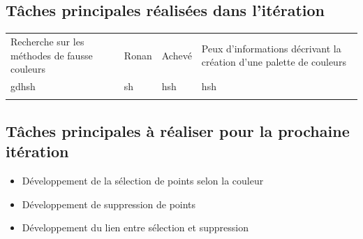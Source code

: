 \documentclass[12pt,titlepage,french]{article}
\begin{document}
\subsection{Tâches principales réalisées dans l'itération}
\noindent\begin{tabu} to \toprule
  &&&\\\toprule
Recherche sur les méthodes de fausse couleurs
& Ronan
& Achevé
& Peux d'informations décrivant la création d'une palette de couleurs\\\midrule
gdhsh
& sh
& hsh
& hsh\\\bottomrule \\
\end{tabu}

\subsection{Tâches principales à réaliser pour la prochaine itération}
\begin{itemize}
  \item Développement de la sélection de points selon la couleur
  \item Développement de suppression de points
  \item Développement du lien entre sélection et suppression
\end{itemize}
\end{document}

